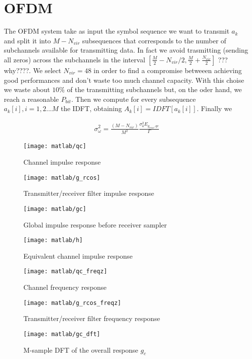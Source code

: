 \documentclass[a4paper,oneside]{article}
\begin{document}
\section{OFDM}
\label{sec:ofdm}
The OFDM system take as input the symbol sequence we want to transmit $a_k$ and split it into $M-N_{vir}$ subsequences that corresponds to the number of subchannels available for transmitting data. In fact we avoid trasmitting (sending all zeros) across the subchannels in the interval $[\frac{M}{2}-N_{vir}/2,\frac{M}{2}+\frac{N_{vir}}{2}]$ ???why????.
We select $N_{vir} = 48$ in order to find a compromise betweeen achieving good performances and don't waste too much channel capacity. With this choise we waste about $ 10\% $ of the transmitting subchannels but, on the oder hand, we reach a reasonable $ P_{bit} $.
Then we compute for every subsequence $a_k[i], i = 1,2...M$ the IDFT, obtaining $A_k[i] = IDFT[a_k[i]]$. Finally we 


\begin{align*}
\sigma_{\omega}^2 = \frac{(M-N_{vir})}{M^2}\frac{\sigma_{a}^2 E_{g_{rcos},qc}}{\Gamma}
\end{align*}




\begin{figure}[htbp]
  \centering
  \texttt{[image: matlab/qc]}
  \caption{Channel impulse response}
  \label{plot:qc}
\end{figure}

\begin{figure}[htbp]
  \centering
  \texttt{[image: matlab/g\_rcos]}
  \caption{Transmitter/receiver filter impulse response}
  \label{plot:g_rcos}
\end{figure}

\begin{figure}[htbp]
  \centering
  \texttt{[image: matlab/gc]}
  \caption{Global impulse response before receiver sampler}
  \label{plot:gc}
\end{figure}

\begin{figure}[htbp]
  \centering
  \texttt{[image: matlab/h]}
  \caption{Equivalent channel impulse response}
  \label{plot:h}
\end{figure}


\begin{figure}[htbp]
  \centering
  \texttt{[image: matlab/qc\_freqz]}
  \caption{Channel frequency response}
  \label{plot:qc_freqz}
\end{figure}

\begin{figure}[htbp]
  \centering
  \texttt{[image: matlab/g\_rcos\_freqz]}
  \caption{Transmitter/receiver filter frequency response}
  \label{plot:g_rcos_freqz}
\end{figure}

\begin{figure}[htbp]
  \centering
  \texttt{[image: matlab/gc\_dft]}
  \caption{M-sample DFT of the overall response $g_c$}
  \label{plot:gc_dft}
\end{figure}
\end{document}
